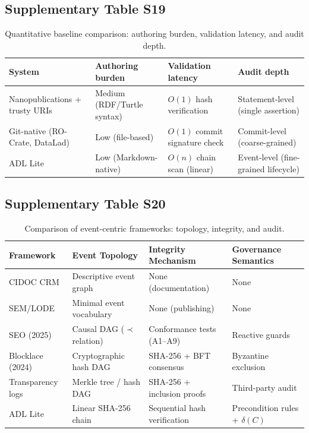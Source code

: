 \subsection{Supplementary Table S19}\label{tab:S19}
\begin{table}[htbp]
\centering
\small
\caption{Quantitative baseline comparison: authoring burden, validation latency, and audit depth.}
\label{tab:quantitative-baseline}
\begin{tabular}{@{}p{3.5cm}p{3.5cm}p{3.5cm}p{3.5cm}@{}}
\toprule
\textbf{System} & \textbf{Authoring burden} & \textbf{Validation latency} & \textbf{Audit depth} \\
\midrule
Nanopublications + trusty URIs & Medium (RDF/Turtle syntax) & $O(1)$ hash verification & Statement-level (single assertion) \\
Git-native (RO-Crate, DataLad) & Low (file-based) & $O(1)$ commit signature check & Commit-level (coarse-grained) \\
ADL Lite & Low (Markdown-native) & $O(n)$ chain scan (linear) & Event-level (fine-grained lifecycle) \\
\bottomrule
\end{tabular}
\end{table}

\subsection{Supplementary Table S20}\label{tab:S20}
\begin{table}[htbp]
\centering
\small
\caption{Comparison of event-centric frameworks: topology, integrity, and audit.}
\label{tab:event-topology}
\begin{tabular}{@{}p{2.2cm}p{2.2cm}p{3cm}p{3cm}@{}}
\toprule
\textbf{Framework} & \textbf{Event Topology} & \textbf{Integrity Mechanism} & \textbf{Governance Semantics} \\
\midrule
CIDOC CRM & Descriptive event graph & None (documentation) & None \\
SEM/LODE & Minimal event vocabulary & None (publishing) & None \\
SEO (2025) & Causal DAG ($\prec$ relation) & Conformance tests (A1--A9) & Reactive guards \\
Blocklace (2024) & Cryptographic hash DAG & SHA-256 + BFT consensus & Byzantine exclusion \\
Transparency logs & Merkle tree / hash DAG & SHA-256 + inclusion proofs & Third-party audit \\
ADL Lite & Linear SHA-256 chain & Sequential hash verification & Precondition rules + $\delta(C)$ \\
\bottomrule
\end{tabular}
\end{table}

